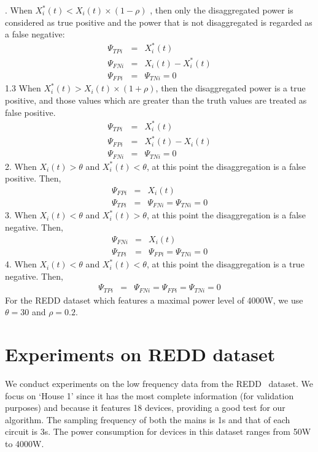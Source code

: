 . When $ X_i^*(t) < X_i(t) \times (1-\rho)$ , then only
the disaggregated power is considered as true positive and
the power that is not disaggregated is regarded as a false negative:
\begin{eqnarray*}
\Psi_{TPi}&=&X_i^*(t) \\
\Psi_{FNi}&=&X_i(t) - X_i^*(t) \\
\Psi_{FPi}&=&\Psi_{TNi}=0
\end{eqnarray*}
1.3 When $ X_i^*(t)>  X_i(t) \times (1+\rho) $, then
the disaggregated power is a true positive, and those values
which are greater than the truth values are treated as false positive.
\begin{eqnarray*}
\Psi_{TPi}&=&X_i^*(t) \\
\Psi_{FPi}&=&X_i^*(t) - X_i(t) \\
\Psi_{FNi}&=&\Psi_{TNi}=0
\end{eqnarray*}
2. When $X_i(t) > \theta$ and  $X_i^*(t)< \theta  $,
at this point the disaggregation is a false positive.  Then,
\begin{eqnarray*}
\Psi_{FPi}&=&X_i(t) \\
\Psi_{TPi}&=&\Psi_{FNi} =\Psi_{TNi}=0
\end{eqnarray*}
3. When $X_i(t) < \theta$ and  $X_i^*(t) > \theta  $,
at this point the disaggregation is a false negative. Then,
\begin{eqnarray*}
\Psi_{FNi}&=&X_i(t) \\
\Psi_{TPi}&=&\Psi_{FPi} =\Psi_{TNi}=0
\end{eqnarray*}
4. When $X_i(t) < \theta$ and  $X_i^*(t) < \theta  $,
at this point the disaggregation is a true negative.  Then,
\begin{eqnarray*}
\Psi_{TPi}&=&\Psi_{FNi} =\Psi_{FPi} =\Psi_{TNi}=0
\end{eqnarray*}
For the REDD dataset which features a maximal power level of 4000W, we use
$\theta=30$ and $\rho=0.2$.

%
\section{Experiments on REDD dataset}
We conduct experiments on the low frequency data
from the REDD~\cite{kolter2010redd} dataset.
We focus on `House 1' since it has the most complete information (for validation
purposes) and because it features 18 devices, providing a good test for our algorithm.
The sampling frequency of both the  mains is 1s and
that of each circuit is 3s.
The power consumption for devices in this dataset
ranges from 50W to 4000W.


